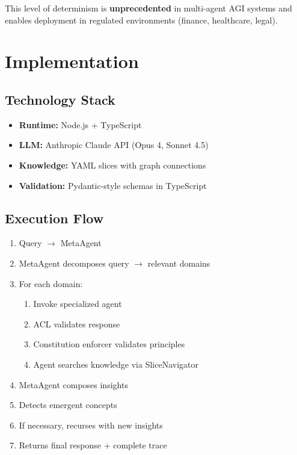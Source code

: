 \documentclass[11pt]{article}
\begin{document}
This level of determinism is \textbf{unprecedented} in multi-agent AGI systems and enables deployment in regulated environments (finance, healthcare, legal).

\section{Implementation}

\subsection{Technology Stack}

\begin{itemize}
    \item \textbf{Runtime:} Node.js + TypeScript
    \item \textbf{LLM:} Anthropic Claude API (Opus 4, Sonnet 4.5)
    \item \textbf{Knowledge:} YAML slices with graph connections
    \item \textbf{Validation:} Pydantic-style schemas in TypeScript
\end{itemize}

\subsection{Execution Flow}

\begin{enumerate}
    \item Query $\rightarrow$ MetaAgent
    \item MetaAgent decomposes query $\rightarrow$ relevant domains
    \item For each domain:
    \begin{enumerate}
        \item Invoke specialized agent
        \item ACL validates response
        \item Constitution enforcer validates principles
        \item Agent searches knowledge via SliceNavigator
    \end{enumerate}
    \item MetaAgent composes insights
    \item Detects emergent concepts
    \item If necessary, recurses with new insights
    \item Returns final response + complete trace
\end{enumerate}
\end{document}
